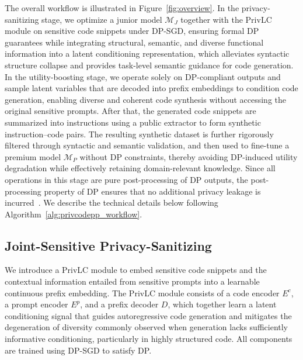 \documentclass{article}
\theoremstyle{plain}
\theoremstyle{definition}
\theoremstyle{remark}
\begin{document}
The overall workflow is illustrated in Figure~\ref{fig:overview}. In the privacy-sanitizing stage, we optimize a junior model $\mathcal{M}_J$ together with the PrivLC module on sensitive code snippets under DP-SGD, ensuring formal DP guarantees while integrating structural, semantic, and diverse functional information into a latent conditioning representation, which alleviates syntactic structure collapse and provides task-level semantic guidance for code generation. In the utility-boosting stage, we operate solely on DP-compliant outputs and sample latent variables that are decoded into prefix embeddings to condition code generation, enabling diverse and coherent code synthesis without accessing the original sensitive prompts. After that, the generated code snippets are summarized into instructions using a public extractor to form synthetic instruction–code pairs.
The resulting synthetic dataset is further rigorously filtered through syntactic and semantic validation, and then used to fine-tune a premium model $\mathcal{M}_P$ without DP constraints, thereby avoiding DP-induced utility degradation while effectively retaining domain-relevant knowledge. Since all operations in this stage are pure post-processing of DP outputs, the post-processing property of DP ensures that no additional privacy leakage is incurred~\cite{dpbook}. We describe the technical details below following Algorithm~\ref{alg:privcodepp_workflow}.


\subsection{Joint-Sensitive Privacy-Sanitizing}
\label{sec:stage1}

We introduce a PrivLC module to embed sensitive code snippets and the contextual information entailed from sensitive prompts into a learnable continuous prefix embedding. The PrivLC module consists of a code encoder $E^c$, a prompt encoder $E^p$, and a prefix decoder $D$,
which together learn a latent conditioning signal that guides autoregressive code generation and mitigates the degeneration of diversity commonly observed when generation lacks sufficiently informative conditioning, particularly in highly structured code. All components are trained using DP-SGD to satisfy DP.
\end{document}
